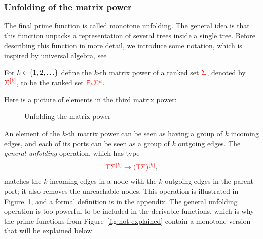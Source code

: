 \subsubsection{Unfolding of the matrix power}
\label{sec:unfolding}
The final  prime function is called monotone unfolding. The general idea is that this function unpacks a representation of several trees inside a single tree.  Before describing this function in more detail,  we introduce some notation, which is inspired by universal algebra, see~\citep[p.~268]{Taylor1975}. 
\begin{definition}
     For $k \in \set{1,2,\ldots}$ define the $k$-th matrix power of a ranked set $\rSigma$, denoted by $\mati k \rSigma$, to be the ranked set $\reduce k \powersmall \rSigma k$.
\end{definition}
Here is a picture of elements in the third matrix power:


\begin{figure}[]
    \caption{Unfolding the matrix power}
    \label{fig:unfold}
\end{figure}

An element of the $k$-th matrix power  can be seen as having a group of $k$ incoming edges, and each of its ports  can be seen as a group of $k$ outgoing edges. The \emph{general unfolding} operation, which has type
\begin{align*}
    \ranked{\tmonad \mati k{\Sigma} \to \mati k{( \tmonad \Sigma)}},
\end{align*}
matches the $k$ incoming edges in a node with the $k$ outgoing edges in the parent port; it also removes the unreachable nodes. This operation is illustrated in Figure~\ref{fig:unfold}, and  a formal definition  is  in the appendix.
The general unfolding operation is too powerful  to be included in the derivable functions, which is why the prime  functions from Figure~\ref{fig:not-explained} contain a monotone version that will be explained below.



